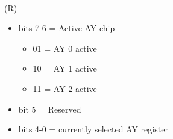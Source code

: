 \\
(R)
\begin{itemize}
\item[] bits 7-6 = Active AY chip
\begin{itemize}
\item 01 = AY 0 active
\item 10 = AY 1 active
\item 11 = AY 2 active
\end{itemize}
\item[] bit 5 = Reserved
\item[] bits 4-0 = currently selected AY register
\end{itemize}
